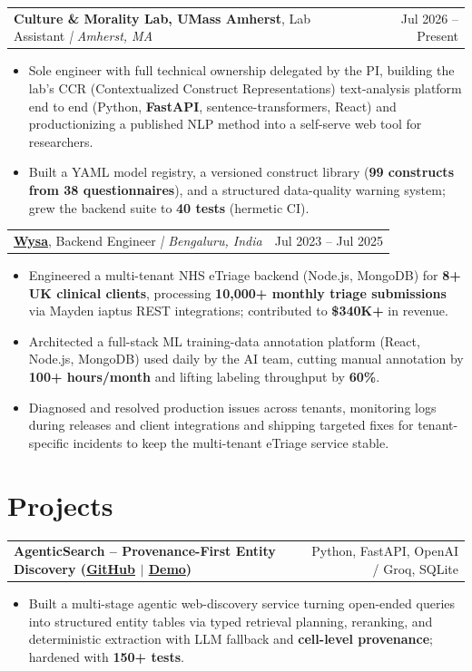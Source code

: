\documentclass[letterpaper,11pt]{article}
\makeatletter
\newcommand{\expItem}[4]{%
  \vspace{2pt}
  \begin{tabular*}{\textwidth}{@{}l@{\extracolsep{\fill}}r@{}}
    \textbf{#1}, #2 \textit{| #3} & #4 \\
  \end{tabular*}\par\vspace{-3pt}
}
\newcommand{\projItem}[2]{%
  \vspace{2pt}
  \begin{tabular*}{\textwidth}{@{}l@{\extracolsep{\fill}}r@{}}
    \textbf{#1} & #2 \\
  \end{tabular*}\par\vspace{-3pt}
}
\makeatother
\begin{document}
\expItem{Culture \& Morality Lab, UMass Amherst}{Lab Assistant}{Amherst, MA}{Jul 2026 -- Present}
\begin{itemize}
  \item Sole engineer with full technical ownership delegated by the PI, building the lab's CCR (Contextualized Construct Representations) text-analysis platform end to end (Python, \textbf{FastAPI}, sentence-transformers, React) and productionizing a published NLP method into a self-serve web tool for researchers.
  \item Built a YAML model registry, a versioned construct library (\textbf{99 constructs from 38 questionnaires}), and a structured data-quality warning system; grew the backend suite to \textbf{40 tests} (hermetic CI).
\end{itemize}

\expItem{\href{https://www.wysa.io}{Wysa}}{Backend Engineer}{Bengaluru, India}{Jul 2023 -- Jul 2025}
\begin{itemize}
  \item Engineered a multi-tenant NHS eTriage backend (Node.js, MongoDB) for \textbf{8+ UK clinical clients}, processing \textbf{10{,}000+ monthly triage submissions} via Mayden iaptus REST integrations; contributed to \textbf{\$340K+} in revenue.
  \item Architected a full-stack ML training-data annotation platform (React, Node.js, MongoDB) used daily by the AI team, cutting manual annotation by \textbf{100+ hours/month} and lifting labeling throughput by \textbf{60\%}.
  \item Diagnosed and resolved production issues across tenants, monitoring logs during releases and client integrations and shipping targeted fixes for tenant-specific incidents to keep the multi-tenant eTriage service stable.
\end{itemize}

\section{Projects}

\projItem{AgenticSearch -- Provenance-First Entity Discovery {\normalfont\small(\href{https://github.com/Deva-1903/ciir_agentic_search}{GitHub} $\vert$ \href{https://agentic-search-negglszkwa-uc.a.run.app}{Demo})}}{Python, FastAPI, OpenAI / Groq, SQLite}
\begin{itemize}
  \item Built a multi-stage agentic web-discovery service turning open-ended queries into structured entity tables via typed retrieval planning, reranking, and deterministic extraction with LLM fallback and \textbf{cell-level provenance}; hardened with \textbf{150+ tests}.
\end{itemize}
\end{document}
